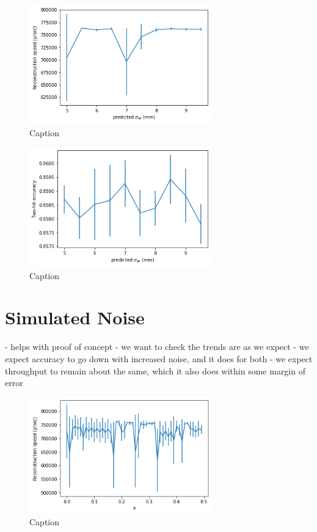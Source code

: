 \begin{figure}
    \centering
    \includegraphics[width=0.7\textwidth]{graphs/pi_spFactor_speed.png}
    \caption{Caption}
    \label{fig:my_label}
\end{figure}

\begin{figure}
    \centering
    \includegraphics[width=0.7\textwidth]{graphs/pi_spFactor_acc.png}
    \caption{Caption}
    \label{fig:my_label}
\end{figure}

\section{Simulated Noise}
- helps with proof of concept - we want to check the trends are as we expect
- we expect accuracy to go down with increased noise, and it does for both
- we expect throughput to remain about the same, which it also does within some margin of error

\begin{figure}
    \centering
    \includegraphics[width=0.7\textwidth]{graphs/pi_enNoise_speed.png}
    \caption{Caption}
    \label{fig:my_label}
\end{figure}

